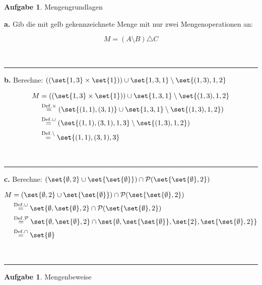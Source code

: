\documentclass[10pt,leqno ]{article}
\DeclarePairedDelimiter\set\{\}
\newcommand\customeq[1]{\overset{\mathrm{#1}}{=}}
\theoremstyle{definition}
\newtheorem{problem}[theorem]{Aufgabe}
\newenvironment{solution}[1][L]{\begin{doublespace}\textbf{#1.}\quad }{\ \rule{0.5em}{0.5em}\end{doublespace}}
\begin{document}
\begin{problem}
Mengengrundlagen
\end{problem}

\begin{solution}[a]
Gib die mit gelb gekennzeichnete Menge mit nur zwei Mengenoperationen an:

\[ M = (A \setminus B) \triangle C \]

\end{solution}

\begin{solution}[b]
Berechne: \( (( \set{1,3} \times \set{1} )) \cup \set{1, 3, 1 } \setminus \set{(1,3), 1,2} \)

\begin{align*}
    M &= (( \set{1,3} \times \set{1} )) \cup \set{1, 3, 1 } \setminus \set{(1,3), 1,2} \\
    & \customeq{Def. \times} (\set{(1,1), (3,1)} \cup \set{1,3,1} \setminus \set{(1,3),1,2}) \\
    & \customeq{Def. \cup} (\set{(1,1),(3,1),1,3} \setminus \set{(1,3),1,2}) \\
    & \customeq{Def. \setminus} \set{(1,1),(3,1),3}
\end{align*}

\end{solution}

\begin{solution}[c]
Berechne: \( ( \set{\emptyset,2} \cup \set{\set{\emptyset}}) \cap \mathcal{P} (\set{ \set{\emptyset}, 2}) \)

\begin{align*}
    M &= ( \set{\emptyset,2} \cup \set{\set{\emptyset}}) \cap \mathcal{P} (\set{ \set{\emptyset}, 2}) \\
    & \customeq{Def. \cup} \set{\emptyset, \set{\emptyset}, 2} \cap \mathcal{P} (\set{ \set{\emptyset}, 2}) \\
    & \customeq{Def. \mathcal{P}} \set{\emptyset, \set{\emptyset}, 2} \cap \set{\emptyset, \set{\set{\emptyset}}, \set{2}, \set{\set{\emptyset}, 2}} \\
    & \customeq{Def. \cap} \set{\emptyset}
\end{align*}

\end{solution}

\begin{problem}
Mengenbeweise
\end{problem}
\end{document}
